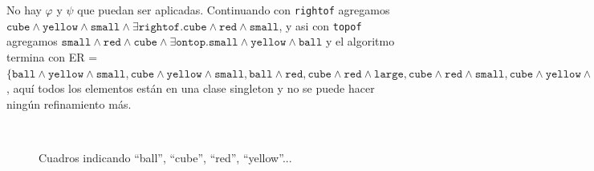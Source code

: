 No hay
$\varphi$ y $\psi$ que puedan ser aplicadas. Continuando con \texttt{rightof} agregamos $\texttt{cube} \wedge \texttt{yellow} \wedge \texttt{small} \wedge \exists \texttt{rightof}. \texttt{cube} \wedge \texttt{red} \wedge \texttt{small}$, y asi con \texttt{topof} agregamos $\texttt{small} \wedge \texttt{red} \wedge \texttt{cube} \wedge \exists \texttt{ontop}. \texttt{small} \wedge \texttt{yellow} \wedge \texttt{ball}$ y el algoritmo termina con ER = $\{\texttt{ball} \wedge \texttt{yellow} \wedge \texttt{small}, \texttt{cube} \wedge \texttt{yellow} \wedge \texttt{small}, \texttt{ball} \wedge \texttt{red}, \texttt{cube} \wedge \texttt{red} \wedge \texttt{large}, \texttt{cube} \wedge \texttt{red} \wedge \texttt{small}, \texttt{cube} \wedge \texttt{yellow} \wedge \texttt{small} \wedge \exists \texttt{rightof}. \texttt{cube} \wedge \texttt{red} \wedge \texttt{small}, \texttt{small} \wedge \texttt{red} \wedge \texttt{cube} \wedge \exists \texttt{ontop}. \texttt{small} \wedge \texttt{yellow} \wedge \texttt{ball}\}$, 
aqu\'i todos los elementos est\'an en una clase singleton y no se puede hacer ning\'un refinamiento m\'as. 





\begin{figure}[ht]
\begin{center}
\\[0pt]
\caption{Cuadros indicando ``ball'', ``cube'', ``red'', ``yellow''...}
\label{fig-modelo16}
\end{center}
\end{figure}


